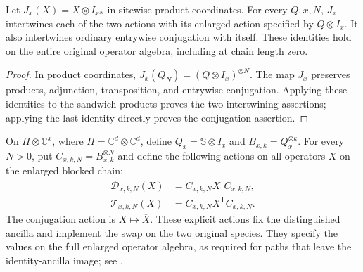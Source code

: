 \begin{lemma}
    \label{lem:mpu_distinguished_physical_matrix_ancilla}
    \leanok
    Let $J_x(X)=X\otimes I_{x^N}$ in sitewise product coordinates.
    For every $Q,x,N$, $J_x$ intertwines each of the two actions with
    its enlarged action specified by $Q\otimes I_x$. It also intertwines
    ordinary entrywise conjugation with itself. These identities hold on
    the entire original operator algebra, including at chain length zero.
\end{lemma}

\begin{proof}\leanok
    In product coordinates,
    $J_x(Q_N)=(Q\otimes I_x)^{\otimes N}$.
    The map $J_x$ preserves products, adjunction, transposition, and
    entrywise conjugation. Applying these identities to the sandwich
    products proves the two intertwining assertions; applying the last
    identity directly proves the conjugation assertion.
\end{proof}

\begin{definition}
    \label{def:mpu_ancilla_swap_actions}
    \leanok
    On $H\otimes\mathbb C^x$, where
    $H=\mathbb C^d\otimes\mathbb C^d$, define
    $Q_x=\mathbb S\otimes I_x$ and $B_{x,k}=Q_x^{\otimes k}$.
    For every $N>0$, put $C_{x,k,N}=B_{x,k}^{\otimes N}$ and define the
    following actions on all operators $X$ on the enlarged blocked chain:
    \begin{align}
        \mathcal D_{x,k,N}(X) & =C_{x,k,N}X^\dagger C_{x,k,N},    \\
        \mathcal T_{x,k,N}(X) & =C_{x,k,N}X^{\mathsf T}C_{x,k,N}.
    \end{align}
    The conjugation action is $X\mapsto\overline X$. These explicit
    actions fix the distinguished ancilla and implement the swap on the
    two original species. They specify the values on the full enlarged
    operator algebra, as required for paths that leave the identity-ancilla
    image; see \cite{gap:mpu_symmetry_ancilla_transport}.
\end{definition}

